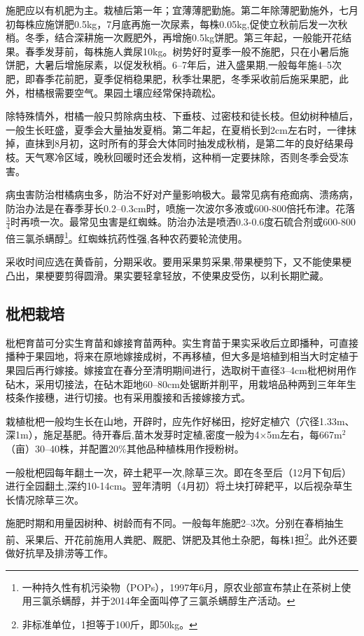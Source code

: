 \documentclass{ctexbook}
\begin{document}
施肥应以有机肥为主。栽植后第一年；宜薄薄肥勤施。第二年除薄肥勤施外，七月初每株应施饼肥0.5kg，7月底再施一次尿素，每株0.05kg,促使立秋前后发一次秋梢。冬季，结合深耕施一次厩肥外，再增施0.5kg饼肥。第三年起，一般能开花结果。春季发芽前，每株施人粪尿10kg。树势好时夏季一般不施肥，只在小暑后施饼肥，大暑后增施尿素，以促发秋梢。6--7年后，进入盛果期,一般每年施4--5次肥，即春季花前肥，夏季促梢稳果肥，秋季壮果肥，冬季采收前后施采果肥，此外，柑橘根需要空气。果园土壤应经常保持疏松。

除特殊情外，柑橘一般只剪除病虫枝、下垂枝、过密枝和徒长枝。但幼树种植后，一般生长旺盛，夏季会大量抽发夏梢。第二年起，在夏梢长到2cm左右时，一律抹掉，直抹到8月初，这时所有的芽会大体同时抽发成秋梢，是第二年的良好结果母枝。天气寒冷区域，晚秋回暖时还会发梢，这种梢一定要抹除，否则冬季会受冻害。

病虫害防治柑橘病虫多，防治不好对产量影响极大。最常见病有疮痂病、溃疡病，防治办法是在春季芽长0.2--0.3cm时，喷施一次波尔多液或600-800倍托布津。花落$\frac{3}{4}$时再喷一次。最常见虫害是红蜘蛛。防治办法是喷洒0.3-0.6度石硫合剂或600-800倍三氯杀螨醇\footnote{一种持久性有机污染物（POPs），1997年6月，原农业部宣布禁止在茶树上使用三氯杀螨醇，并于2014年全面叫停了三氯杀螨醇生产活动。}。红蜘蛛抗药性强,各种农药要轮流使用。

采收时间应选在黄昏前，分期采收。要用采果剪采果,带果梗剪下，又不能使果梗凸出，果梗要剪得圆滑。果实要轻拿轻放，不使果皮受伤，以利长期贮藏。
\subsection{枇杷栽培}
枇杷育苗可分实生育苗和嫁接育苗两种。实生育苗于果实采收后立即播种，可直接播种于果园地，将来在原地嫁接成树，不再移植，但大多是培植到相当大时定植于果园后再行嫁接。嫁接宜在春分至清明期间进行，选取树干直径3--4cm枇杷树用作砧木，采用切接法，在砧木距地60--80cm处锯断并削平，用栽培品种两到三年年生枝条作接穗，进行切接。也有采用腹接和舌接嫁接方式。

栽植枇杷一般均生长在山地，开辟时，应先作好梯田，挖好定植穴（穴径1.33m、深1m），施足基肥。待开春后,苗木发芽时定植,密度一般为4$\times$5m左右，每667m$^2$（亩）30--40株，并配置20\%其他品种植株用作授粉树。

一般枇杷园每年翻土一次，碎土耙平一次,除草三次。即在冬至后（12月下旬后）进行全园翻土,深约10-14cm。翌年清明（4月初）将土块打碎耙平，以后视杂草生长情况除草三次。

施肥时期和用量因树种、树龄而有不同。一般每年施肥2--3次。分别在春梢抽生前、采果后、开花前施用人粪肥、厩肥、饼肥及其他土杂肥，每株1担\footnote{非标准单位，1担等于100斤，即50kg。}。此外还要做好抗旱及排涝等工作。
\end{document}
